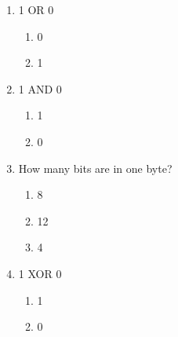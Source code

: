 \documentclass[twocolumn]{article}
\begin{document}
\begin{enumerate}



  \item 1 OR 0

  \begin{enumerate}
   
   \item 0
   
   \item 1
   
  \end{enumerate}



  \item 1 AND 0

  \begin{enumerate}
   
   \item 1
   
   \item 0
   
  \end{enumerate}



  \item How many bits are in one byte?

  \begin{enumerate}
   
   \item 8
   
   \item 12
   
   \item 4
   
  \end{enumerate}



  \item 1 XOR 0

  \begin{enumerate}
   
   \item 1
   
   \item 0
   
  \end{enumerate}


\end{enumerate}


\end{document}
